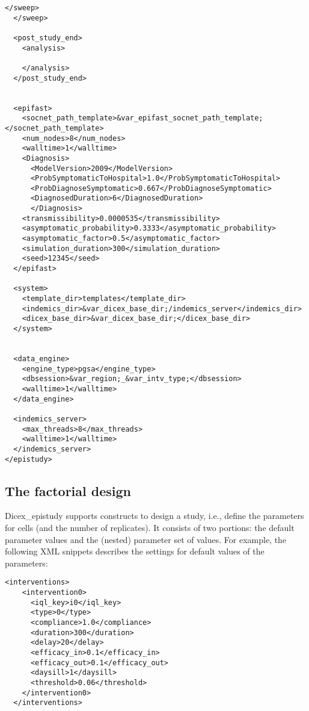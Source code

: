 \documentclass[11]{report}
\begin{document}
\begin{lstlisting}[style=XML]
    </sweep>
  </sweep>
  
  <post_study_end>
    <analysis>
      
    </analysis>
  </post_study_end>


  <epifast>
    <socnet_path_template>&var_epifast_socnet_path_template;</socnet_path_template>
    <num_nodes>8</num_nodes>
    <walltime>1</walltime>
    <Diagnosis> 
      <ModelVersion>2009</ModelVersion>
      <ProbSymptomaticToHospital>1.0</ProbSymptomaticToHospital>
      <ProbDiagnoseSymptomatic>0.667</ProbDiagnoseSymptomatic>
      <DiagnosedDuration>6</DiagnosedDuration>
      </Diagnosis>
    <transmissibility>0.0000535</transmissibility>
    <asymptomatic_probability>0.3333</asymptomatic_probability>
    <asymptomatic_factor>0.5</asymptomatic_factor>
    <simulation_duration>300</simulation_duration>
    <seed>12345</seed>
  </epifast>

  <system>
    <template_dir>templates</template_dir>  
    <indemics_dir>&var_dicex_base_dir;/indemics_server</indemics_dir>
    <dicex_base_dir>&var_dicex_base_dir;</dicex_base_dir>
  </system>


  <data_engine>
    <engine_type>pgsa</engine_type>
    <dbsession>&var_region;_&var_intv_type;</dbsession>
    <walltime>1</walltime>
  </data_engine>

  <indemics_server>
    <max_threads>8</max_threads>
    <walltime>1</walltime>
  </indemics_server>
</epistudy>
\end{lstlisting}


\subsection{The factorial design}
Dicex\_epistudy supports constructs to design a  study, i.e., define the parameters for  cells (and the number of replicates). It consists of two portions: the default parameter values and the (nested) parameter  set of values.
For example, the following XML snippets describes the settings for default values of the parameters:
\begin{lstlisting}[style=XML]
    <interventions>
    <intervention0>
      <iql_key>i0</iql_key>
      <type>0</type>
      <compliance>1.0</compliance>
      <duration>300</duration>
      <delay>20</delay>
      <efficacy_in>0.1</efficacy_in>
      <efficacy_out>0.1</efficacy_out>
      <daysill>1</daysill>
      <threshold>0.06</threshold>
    </intervention0>
  </interventions>
  \end{lstlisting}
\end{document}
